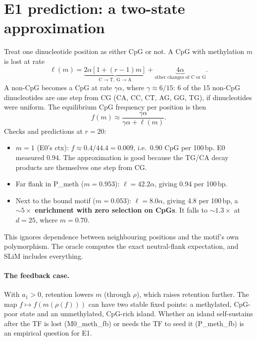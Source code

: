 \documentclass[11pt]{article}
\theoremstyle{definition}
\begin{document}
\section{E1 prediction: a two-state approximation}\label{sec:e1}
Treat one dinucleotide position as either CpG or not. A CpG with methylation $m$ is lost at rate
\begin{equation}
\ell(m)=\underbrace{2\alpha[1+(r-1)m]}_{\text{C}\to\text{T},\ \text{G}\to\text{A}}+\underbrace{4\alpha}_{\text{other changes of C or G}}.
\end{equation}
A non-CpG becomes a CpG at rate $\gamma\alpha$, where $\gamma\approx 6/15$: 6 of the 15 non-CpG dinucleotides are one
step from CG (CA, CC, CT, AG, GG, TG), if dinucleotides were uniform. The equilibrium CpG frequency per position is then
\begin{equation}
f(m)\approx\frac{\gamma\alpha}{\gamma\alpha+\ell(m)}.
\end{equation}
Checks and predictions at $r=20$:
\begin{itemize}
\item $m=1$ (E0's ctx): $f\approx0.4/44.4=0.009$, i.e.\ 0.90 CpG per 100\,bp. E0 measured 0.94. The approximation is
  good because the TG/CA decay products are themselves one step from CG.
\item Far flank in P\_meth ($m=0.953$): $\ell=42.2\alpha$, giving 0.94 per 100\,bp.
\item Next to the bound motif ($m=0.053$): $\ell=8.0\alpha$, giving 4.8 per 100\,bp, a \textbf{${\sim}5\times$ enrichment
  with zero selection on CpGs}. It falls to ${\sim}1.3\times$ at $d=25$, where $m=0.70$.
\end{itemize}
This ignores dependence between neighbouring positions and the motif's own polymorphism. The oracle computes the exact
neutral-flank expectation, and SLiM includes everything.

\paragraph{The feedback case.} With $a_1>0$, retention lowers $m$ (through $\rho$), which raises retention further. The
map $f\mapsto f(m(\rho(f)))$ can have two stable fixed points: a methylated, CpG-poor state and an unmethylated,
CpG-rich island. Whether an island self-sustains after the TF is lost (M0\_meth\_fb) or needs the TF to seed it
(P\_meth\_fb) is an empirical question for E1.
\end{document}
